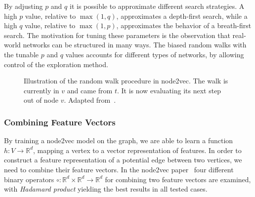 By adjusting $p$ and $q$ it is possible to approximate different search strategies. A high $p$ value, relative to $\max(1,q)$, approximates a depth-first search, while a high $q$ value, relative to $\max(1,p)$, approximates the behavior of a breath-first search. The motivation for tuning these parameters is the observation that real-world networks can be structured in many ways. The biased random walks with the tunable $p$ and $q$ values accounts for different types of networks, by allowing control of the exploration method.

\begin{figure}%
  \centering
\caption[Illustration of random walk in node2vec]{Illustration of the random walk procedure in node2vec. The walk is currently in $v$ and came from $t$. It is now evaluating its next step out of node $v$. Adapted from~\cite{node2vec}.}%
\label{fig:randomwalk}%
\end{figure}

\subsubsection{Combining Feature Vectors}
By training a node2vec model on the graph, we are able to learn a function $h:V \to \mathbb{R}^d$, mapping a vertex to a vector representation of features. In order to construct a feature representation of a potential edge between two vertices, we need to combine their feature vectors. In the node2vec paper~\cite{node2vec} four different binary operators $\circ : \mathbb{R}^d \times \mathbb{R}^d \to \mathbb{R}^d$ for combining two feature vectors are examined, with \emph{Hadamard product} yielding the best results in all tested cases.

